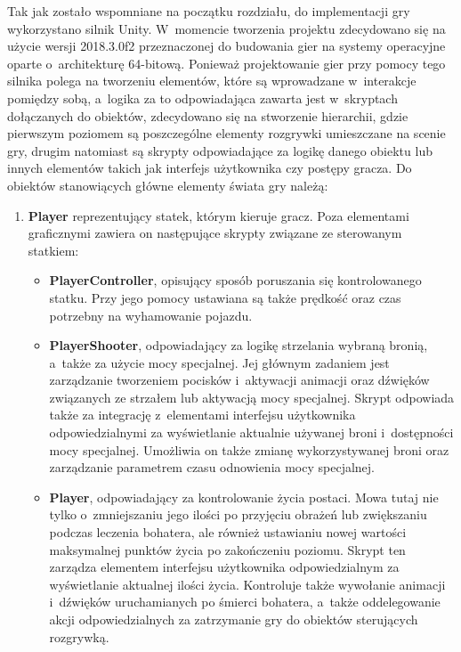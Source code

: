 Tak jak zostało wspomniane na początku rozdziału, do implementacji gry wykorzystano silnik Unity. W~momencie tworzenia projektu zdecydowano się na użycie wersji 2018.3.0f2 przeznaczonej do budowania gier na systemy operacyjne oparte o~architekturę 64-bitową. Ponieważ projektowanie gier przy pomocy tego silnika polega na tworzeniu elementów, które są wprowadzane w~interakcje pomiędzy sobą, a~logika za to odpowiadająca zawarta jest w~skryptach dołączanych do obiektów, zdecydowano się na stworzenie hierarchii, gdzie pierwszym poziomem są poszczególne elementy rozgrywki umieszczane na scenie gry, drugim natomiast są skrypty odpowiadające za logikę danego obiektu lub innych elementów takich jak interfejs użytkownika czy postępy gracza. Do obiektów stanowiących główne elementy świata gry należą:
\begin{enumerate}
	\item \textbf{Player} reprezentujący statek, którym kieruje gracz. Poza elementami graficznymi zawiera on następujące skrypty związane ze sterowanym statkiem:
	\begin{itemize}
		\item \textbf{PlayerController}, opisujący sposób poruszania się kontrolowanego statku. Przy jego pomocy ustawiana są także prędkość oraz czas potrzebny na wyhamowanie pojazdu.
		\item \textbf{PlayerShooter}, odpowiadający za logikę strzelania wybraną bronią, a~także za użycie mocy specjalnej. Jej głównym zadaniem jest zarządzanie tworzeniem pocisków i~aktywacji animacji oraz dźwięków związanych ze strzałem lub aktywacją mocy specjalnej. Skrypt odpowiada także za integrację z~elementami interfejsu użytkownika odpowiedzialnymi za wyświetlanie aktualnie używanej broni i~dostępności mocy specjalnej. Umożliwia on także zmianę wykorzystywanej broni oraz zarządzanie parametrem czasu odnowienia mocy specjalnej. 
		\item \textbf{Player}, odpowiadający za kontrolowanie życia postaci. Mowa tutaj nie tylko o~zmniejszaniu jego ilości po przyjęciu obrażeń lub zwiększaniu podczas leczenia bohatera, ale również ustawianiu nowej wartości maksymalnej punktów życia po zakończeniu poziomu. Skrypt ten zarządza elementem interfejsu użytkownika odpowiedzialnym za wyświetlanie aktualnej ilości życia. Kontroluje także wywołanie animacji i~dźwięków uruchamianych po śmierci bohatera, a~także oddelegowanie akcji odpowiedzialnych za zatrzymanie gry do obiektów sterujących rozgrywką.
	\end{itemize}


\end{enumerate}
